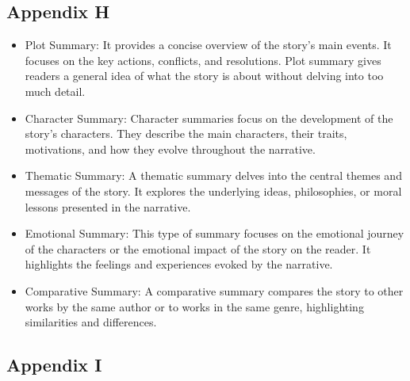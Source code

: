 \documentclass[11pt]{article}
\begin{document}
\subsection{Appendix H}
\label{appendix:h}
\begin{itemize}
  \item Plot Summary:
  It provides a concise overview of the story's main events. It focuses on the key actions, conflicts, and resolutions. Plot summary gives readers a general idea of what the story is about without delving into too much detail.
  \item Character Summary:
  Character summaries focus on the development of the story's characters. They describe the main characters, their traits, motivations, and how they evolve throughout the narrative.
  \item Thematic Summary:
  A thematic summary delves into the central themes and messages of the story. It explores the underlying ideas, philosophies, or moral lessons presented in the narrative.
  \item Emotional Summary:
  This type of summary focuses on the emotional journey of the characters or the emotional impact of the story on the reader. It highlights the feelings and experiences evoked by the narrative.
  \item Comparative Summary:
  A comparative summary compares the story to other works by the same author or to works in the same genre, highlighting similarities and differences.

\end{itemize}
\subsection{Appendix I}
\end{document}
